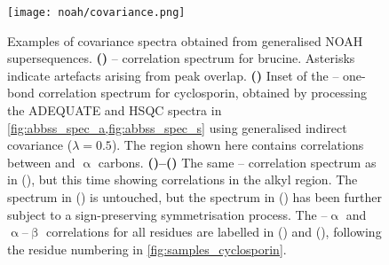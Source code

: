 \begin{figure}[!ht]
    \centering
    \texttt{[image: noah/covariance.png]}%
    {\label{fig:covariance_spec_bruc_cn}}%
    {\label{fig:covariance_spec_cyclo_caco}}%
    {\label{fig:covariance_spec_cyclo_cacb_nosymm}}%
    {\label{fig:covariance_spec_cyclo_cacb_symm}}%
    \caption[Examples of covariance spectra obtained from generalised NOAH supersequences]{
        Examples of covariance spectra obtained from generalised NOAH supersequences.
        \textbf{()} \carbon{}--\nitrogen{} correlation spectrum for brucine.
        Asterisks indicate artefacts arising from peak overlap.
        \textbf{()} Inset of the \carbon{}--\carbon{} one-bond correlation spectrum for cyclosporin, obtained by processing the ADEQUATE and \carbon{} HSQC spectra in \cref{fig:abbss_spec_a,fig:abbss_spec_s} using generalised indirect covariance ($\lambda = 0.5$).
        The region shown here contains correlations between  and $\upalpha$ carbons.
        \textbf{()--()} The same \carbon{}--\carbon{} correlation spectrum as in (), but this time showing correlations in the alkyl region.
        The spectrum in () is untouched, but
        the spectrum in () has been further subject to a sign-preserving symmetrisation process.
        The --$\upalpha$ and $\upalpha$--$\upbeta$ correlations for all residues are labelled in () and (), following the residue numbering in \cref{fig:samples_cyclosporin}.
    }
    \label{fig:covariance_spec}
\end{figure}
